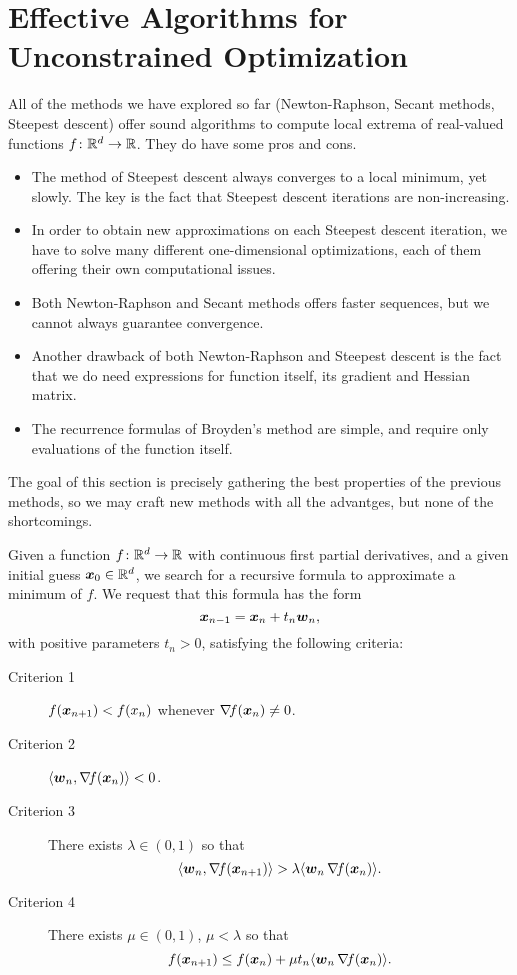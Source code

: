 
\section{Effective Algorithms for Unconstrained Optimization}
All of the methods we have explored so far (Newton-Raphson, Secant methods, Steepest descent) offer sound algorithms to compute local extrema of real-valued functions $f \colon \mathbb{R}^d \to \mathbb{R}$. They do have some pros and cons.  
\begin{itemize}
	\item The method of Steepest descent always converges to a local minimum, yet slowly.  The key is the fact that Steepest descent iterations are non-increasing.
	\item In order to obtain new approximations on each Steepest descent iteration, we have to solve many different one-dimensional optimizations, each of them offering their own computational issues. 
	\item Both Newton-Raphson and Secant methods offers faster sequences, but we cannot always guarantee convergence.  
	\item Another drawback of both Newton-Raphson and Steepest descent is the fact that we do need expressions for function itself, its gradient and Hessian matrix.  
	\item The recurrence formulas of Broyden's method are simple, and require only evaluations of the function itself.
\end{itemize}

The goal of this section is precisely gathering the best properties of the previous methods, so we may craft new methods with all the advantges, but none of the shortcomings.  

\separator

Given a function $f \colon \mathbb{R}^d \to \mathbb{R}$ with continuous first partial derivatives, and a given initial guess $\boldsymbol{x}_0 \in \mathbb{R}^d$, we search for a recursive formula to approximate a minimum of $f$.  We request that this formula has the form
\begin{equation*}
\boldsymbol{x}_{n-1} = \boldsymbol{x}_n + t_n \boldsymbol{w}_n,
\end{equation*}
with positive parameters $t_n > 0$, satisfying the following criteria:
\begin{description}
	\item[Criterion 1] $f(\boldsymbol{x}_{n+1}) < f(x_n)$ whenever $\mathop{\nabla\! {f}}(\boldsymbol{x}_n) \neq 0$.
	\item[Criterion 2] $\langle \boldsymbol{w}_n , \mathop{\nabla\! {f}}(\boldsymbol{x}_n) \rangle < 0$.
	\item[Criterion 3] There exists $\lambda \in (0,1)$ so that 
	\begin{equation*}
	\langle \boldsymbol{w}_n , \mathop{\nabla\! {f}}(\boldsymbol{x}_{n+1}) \rangle > \lambda \langle \boldsymbol{w}_n \mathop{\nabla\! {f}} (\boldsymbol{x}_n) \rangle.
	\end{equation*}
	\item[Criterion 4] There exists $\mu \in (0,1)$, $\mu < \lambda$ so that
	\begin{equation*}
	f(\boldsymbol{x}_{n+1}) \leq f(\boldsymbol{x}_n) + \mu t_n \langle \boldsymbol{w}_n \mathop{\nabla\! {f}}(\boldsymbol{x}_n) \rangle.
	\end{equation*}
\end{description}

